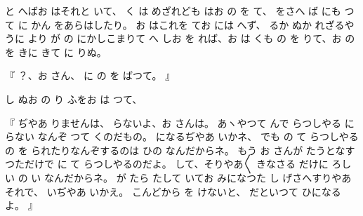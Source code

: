 と
へばお
はそれと
いて、
く
は
めざれども
はお
の
を
て、
をさへ
ば
にも
つて
に
かん
をあらはしたり。
お
はこれを
てお
には
へず、
るか
ぬか
れざるやうに
より
が
の
にかしこまりて
へ
しお
を
れば、お
は
くも
の
を
りて、お
の
を
きに
きて
に
りぬ。

『
？、お
さん、
に
の
を
ばつて。
』

し
ぬお
の
り
ふをお
は
つて、

『
ぢやあ
りませんは、
らないよ、お
さんは。
あヽやつて
んで
らつしやる
に
らない
なんぞ
つて
くのだもの。
になるぢやあ
いかネ、
でも
の
て
らつしやる
の
を
られたりなんぞするのは
ひの
なんだからネ。
もう
お
さんが
たうとなすつただけで
に
て
らつしやるのだよ。
して、そりやあ〳〵
きなさる
だけに
ろしい
の
い
なんだからネ。
が
たら
たして
いてお
みになつた
し
げさへすりやあそれで、
いぢやあ
いかえ。
こんどから
を
けないと、
だといつて
ひになるよ。
』

